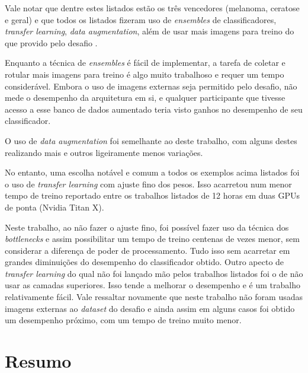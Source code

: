 Vale notar que dentre estes listados estão os três vencedores (melanoma, ceratose e geral) e que todos os listados fizeram uso de \textit{ensembles} de classificadores, \textit{transfer learning}, \textit{data augmentation}, além de usar mais imagens para treino do que provido pelo desafio \cite{Codella2017}. 

Enquanto a técnica de \textit{ensembles} é fácil de implementar, a tarefa de coletar e rotular mais imagens para treino é algo muito trabalhoso e requer um tempo considerável. 
Embora o uso de imagens externas seja permitido pelo desafio, não mede o desempenho da arquitetura em si, e qualquer participante que tivesse acesso a esse banco de dados aumentado teria visto ganhos no desempenho de seu classificador.

O uso de \textit{data augmentation} foi semelhante ao deste trabalho, com alguns destes realizando mais e outros ligeiramente menos variações. 

No entanto, uma escolha notável e comum a todos os exemplos acima listados foi o uso de \textit{transfer learning} com ajuste fino dos pesos. Isso acarretou num menor tempo de treino reportado entre os trabalhos listados de 12 horas em duas GPUs de ponta (Nvidia Titan X).

Neste trabalho, ao não fazer o ajuste fino, foi possível fazer uso da técnica dos \textit{bottlenecks} e assim possibilitar um tempo de treino centenas de vezes menor, sem considerar a diferença de poder de processamento. Tudo isso sem acarretar em grandes diminuições do desempenho do classificador obtido. Outro apecto de \textit{transfer learning} do qual não foi lançado mão pelos trabalhos listados foi o de não usar as camadas superiores. Isso tende a melhorar o desempenho e é um trabalho relativamente fácil. Vale ressaltar novamente que neste trabalho não foram usadas imagens externas ao \textit{dataset} do desafio e ainda assim em alguns casos foi obtido um desempenho próximo, com um tempo de treino muito menor.

\section{Resumo}

